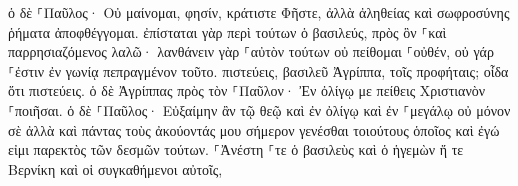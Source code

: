 \documentclass{openreader}
\begin{document}
ὁ δὲ ⸀Παῦλος· Οὐ μαίνομαι, φησίν, κράτιστε Φῆστε, ἀλλὰ ἀληθείας καὶ σωφροσύνης ῥήματα ἀποφθέγγομαι. 
ἐπίσταται γὰρ περὶ τούτων ὁ βασιλεύς, πρὸς ὃν ⸀καὶ παρρησιαζόμενος λαλῶ· λανθάνειν γὰρ ⸀αὐτὸν τούτων οὐ πείθομαι ⸀οὐθέν, οὐ γάρ ⸀ἐστιν ἐν γωνίᾳ πεπραγμένον τοῦτο. 
πιστεύεις, βασιλεῦ Ἀγρίππα, τοῖς προφήταις; οἶδα ὅτι πιστεύεις. 
ὁ δὲ Ἀγρίππας πρὸς τὸν ⸀Παῦλον· Ἐν ὀλίγῳ με πείθεις Χριστιανὸν ⸀ποιῆσαι. 
ὁ δὲ ⸀Παῦλος· Εὐξαίμην ἂν τῷ θεῷ καὶ ἐν ὀλίγῳ καὶ ἐν ⸀μεγάλῳ οὐ μόνον σὲ ἀλλὰ καὶ πάντας τοὺς ἀκούοντάς μου σήμερον γενέσθαι τοιούτους ὁποῖος καὶ ἐγώ εἰμι παρεκτὸς τῶν δεσμῶν τούτων. 
⸀Ἀνέστη ⸀τε ὁ βασιλεὺς καὶ ὁ ἡγεμὼν ἥ τε Βερνίκη καὶ οἱ συγκαθήμενοι αὐτοῖς, 
\end{document}
